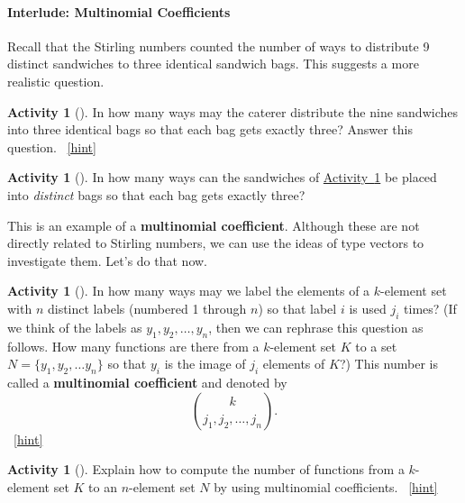 \documentclass[10pt,]{book}
\newcommand{\terminology}[1]{\textbf{#1}}
\theoremstyle{plain}
\theoremstyle{definition}
\theoremstyle{definition}
\theoremstyle{definition}
\newtheorem{activity}[project]{Activity}
\numberwithin{equation}{chapter}
\begin{document}
\paragraph[{Interlude: Multinomial Coefficients}]{Interlude: Multinomial Coefficients}\hypertarget{pars-multinomial}{}
\hypertarget{p-1009}{}%
Recall that the Stirling numbers counted the number of ways to distribute 9 distinct sandwiches to three identical sandwich bags.  This suggests a more realistic question.%
\begin{activity}[]\label{caterer2}
\hypertarget{p-1010}{}%
In how many ways may the caterer distribute the nine sandwiches into three identical bags so that each bag gets exactly three? Answer this question.%
~\hfill{\tiny\hyperlink{a-217}{[hint]}\hypertarget{q-217}{}}\end{activity}
\begin{activity}[]\label{activity-218}
\hypertarget{p-1013}{}%
In how many ways can the sandwiches of \hyperref[caterer2]{Activity~\ref{caterer2}} be placed into \emph{distinct} bags so that each bag gets exactly three?%
\end{activity}
\hypertarget{p-1016}{}%
This is an example of a \terminology{multinomial coefficient}.  Although these are not directly related to Stirling numbers, we can use the ideas of type vectors to investigate them.  Let's do that now.%
\begin{activity}[]\label{activity-219}
\hypertarget{p-1017}{}%
In how many ways may we label the elements of a \(k\)-element set with \(n\) distinct labels (numbered 1 through \(n\)) so that label \(i\) is used \(j_i\) times? (If we think of the labels as \(y_1, y_2, \ldots, y_n\), then we can rephrase this question as follows.  How many functions are there from a \(k\)-element set \(K\) to a set \(N=\{y_1,y_2,\ldots y_n\}\) so that \(y_i\) is the image of \(j_i\) elements of \(K\)?) This number is called a \terminology{multinomial coefficient} and denoted by%
\begin{equation*}
\binom{k}{j_1,j_2,\ldots, j_n}.
\end{equation*}
%
~\hfill{\tiny\hyperlink{a-219}{[hint]}\hypertarget{q-219}{}}\end{activity}
\begin{activity}[]\label{activity-220}
\hypertarget{p-1021}{}%
Explain how to compute the number of functions from a \(k\)-element set \(K\) to an \(n\)-element set \(N\) by using multinomial coefficients.%
~\hfill{\tiny\hyperlink{a-220}{[hint]}\hypertarget{q-220}{}}\end{activity}
\end{document}

